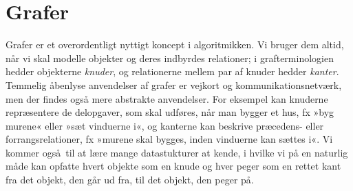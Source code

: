 \section{Grafer}


%
%
%
%
%
%
Grafer er et overordentligt nyttigt koncept i algoritmikken.
Vi bruger dem altid, når vi skal modelle objekter og deres indbyrdes relationer; i grafterminologien hedder objekterne \emph{knuder}, og relationerne mellem par af knuder hedder \emph{kanter}.
Temmelig åbenlyse anvendelser af grafer er vejkort og kommunikationsnetværk,
men der findes også mere abstrakte anvendelser.
For eksempel kan knuderne repræsentere de delopgaver, som skal udføres, når man bygger et hus, fx »byg murene« eller »sæt vinduerne i«, og kanterne kan beskrive præcedens- eller forrangsrelationer, fx »murene skal bygges, inden vinduerne kan sættes i«.
Vi kommer også til at lære mange datastukturer at kende, i hvilke vi på en naturlig måde kan opfatte hvert objekte som en knude og hver peger som en rettet kant fra det objekt, den går ud fra, til det objekt, den peger på.

